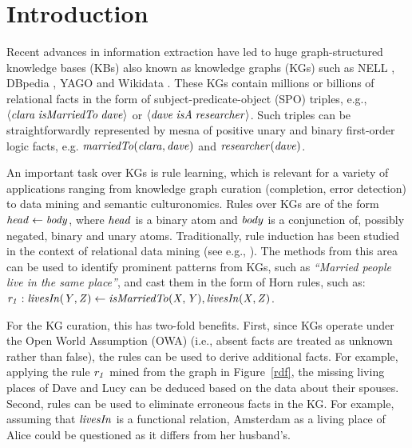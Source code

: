 \section{Introduction}
\label{sec:intro}

Recent advances in information extraction have led to
huge graph-structured knowledge bases (KBs) also known as knowledge graphs (KGs) such as NELL \cite{nell}, DBpedia \cite{dbpedia}, YAGO \cite{yago} and Wikidata \cite{wikidata}. These KGs contain millions or billions of relational facts in the form of subject-predicate-object (SPO) triples, e.g., $\langle\mathit{clara\;isMarriedTo\;dave}\rangle$ or $\langle\mathit{dave\;isA\;researcher}\rangle$. Such triples can be straightforwardly represented by mesna of positive unary and binary first-order logic facts, e.g. $\mathit{marriedTo(clara,dave)}$ and $\mathit{researcher(dave)}$.

An important task over KGs is rule learning, which is relevant for a variety of applications ranging from knowledge graph curation (completion, error detection) \cite{DBLP:journals/semweb/Paulheim17} to data mining and semantic culturonomics. Rules over KGs are of the form $\mathit{head \leftarrow body}$, where $\mathit{head}$ is a binary atom and $\mathit{body}$ is a conjunction of, possibly negated, binary and unary atoms. 
Traditionally, rule induction has been studied in the context of relational data mining (see e.g., \cite{amie,op,rdf2rules}). The methods from this area can be used to identify prominent patterns from KGs, such as \emph{``Married people live in the same
place''}, and cast them in the form of Horn rules, such as:
$\mathit{r_1:\;}\mathit{livesIn(Y,Z)}\leftarrow \mathit{isMarriedTo(X,Y),livesIn(X,Z)}$.

For the KG curation, this has two-fold benefits. First, since KGs operate under the Open World
Assumption (OWA) (i.e., absent facts are treated as unknown rather than false),
the rules can be used to derive additional facts. For example, applying the rule
$\mathit{r_1}$ mined from the graph in Figure~\ref{rdf}, the missing living places of Dave and Lucy can be deduced based on the data about their spouses. Second, rules can be used to eliminate erroneous facts in the KG. For example, assuming that $\mathit{livesIn}$ is a functional relation, Amsterdam as a living place of
Alice could be questioned as it differs from her husband's.

